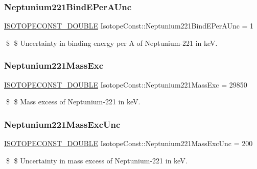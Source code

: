 \subsubsection{\texorpdfstring{Neptunium221\+Bind\+E\+Per\+A\+Unc}{Neptunium221BindEPerAUnc}}
{\footnotesize\ttfamily \mbox{\hyperlink{group___isotope_const-_macros_ga8f45a7272ce02c0b4c65c44636ed719a}{I\+S\+O\+T\+O\+P\+E\+C\+O\+N\+S\+T\+\_\+\+D\+O\+U\+B\+LE}} Isotope\+Const\+::\+Neptunium221\+Bind\+E\+Per\+A\+Unc = 1}

\$ \$ Uncertainty in binding energy per A of Neptunium-\/221 in keV. \mbox{\label{group___isotope_const-_neptunium-_np221_ga48b216eacce40a4b32d9aef9865c9d5d}} 
\subsubsection{\texorpdfstring{Neptunium221\+Mass\+Exc}{Neptunium221MassExc}}
{\footnotesize\ttfamily \mbox{\hyperlink{group___isotope_const-_macros_ga8f45a7272ce02c0b4c65c44636ed719a}{I\+S\+O\+T\+O\+P\+E\+C\+O\+N\+S\+T\+\_\+\+D\+O\+U\+B\+LE}} Isotope\+Const\+::\+Neptunium221\+Mass\+Exc = 29850}

\$ \$ Mass excess of Neptunium-\/221 in keV. \mbox{\label{group___isotope_const-_neptunium-_np221_ga9555bc595651d0f63cbb3aab049ac697}} 
\subsubsection{\texorpdfstring{Neptunium221\+Mass\+Exc\+Unc}{Neptunium221MassExcUnc}}
{\footnotesize\ttfamily \mbox{\hyperlink{group___isotope_const-_macros_ga8f45a7272ce02c0b4c65c44636ed719a}{I\+S\+O\+T\+O\+P\+E\+C\+O\+N\+S\+T\+\_\+\+D\+O\+U\+B\+LE}} Isotope\+Const\+::\+Neptunium221\+Mass\+Exc\+Unc = 200}

\$ \$ Uncertainty in mass excess of Neptunium-\/221 in keV. \mbox{\label{group___isotope_const-_neptunium-_np221_gae0d92609d81f0aaf49f5ae5849c67e4a}} 
